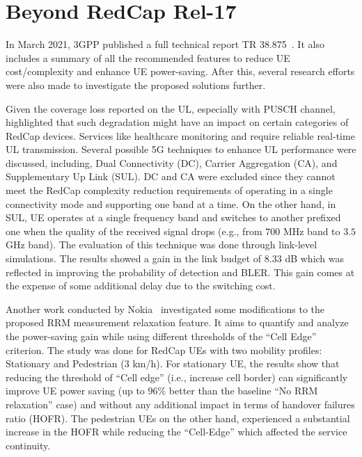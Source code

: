 \documentclass[]{IEEEtran}
\begin{document}
\section{Beyond RedCap Rel-17}
\label{sec:7-beyond-redcap17}



In March 2021, 3GPP published a full technical report TR 38.875~\cite{3gpp_study_2021_38.875}. 
It also includes a summary of all the recommended features to reduce UE cost/complexity and enhance UE power-saving.
After this, several research efforts were also made to investigate the proposed solutions further.

Given the coverage loss reported on the UL, especially with PUSCH channel,~\cite{saafi_enhancing_2022} highlighted that such degradation might have an impact on certain categories of RedCap devices. 
Services like healthcare monitoring and require reliable real-time UL transmission. Several possible 5G techniques to enhance UL performance were discussed, including, Dual Connectivity (DC), Carrier Aggregation (CA), and Supplementary Up Link (SUL). 
DC and CA were excluded since they cannot meet the RedCap complexity reduction requirements of operating in a single connectivity mode and supporting one band at a time. 
On the other hand, in SUL, UE operates at a single frequency band and switches to another prefixed one when the quality of the received signal drops (e.g., from $700$ MHz band to $3.5$ GHz band).
The evaluation of this technique was done through link-level simulations.
The results showed a gain in the link budget of $8.33$ dB which was reflected in improving the probability of detection and BLER. 
This gain comes at the expense of some additional delay due to the switching cost.

Another work conducted by Nokia~\cite{tayyab_energy_2022} investigated some modifications to the proposed RRM measurement relaxation feature. 
It aims to quantify and analyze the power-saving gain while using different thresholds of the ``Cell Edge'' criterion. 
The study was done for RedCap UEs with two mobility profiles: Stationary and Pedestrian ($3$ km/h). For stationary UE, the results show that reducing the threshold of ``Cell edge'' (i.e., increase cell border) can significantly improve UE power saving (up to $96$\% better than the baseline ``No RRM relaxation'' case) and without any additional impact in terms of handover failures ratio (HOFR). 
The pedestrian UEs on the other hand, experienced a substantial increase in the HOFR while reducing the ``Cell-Edge'' which affected the service continuity.
\end{document}
